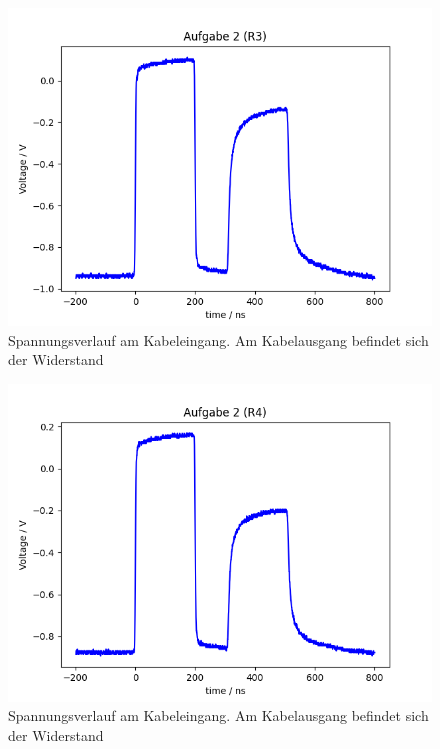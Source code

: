 \documentclass{article}
\begin{document}
\begin{figure}[H]
\centering
\caption{Spannungsverlauf am Kabeleingang. Am Kabelausgang befindet sich der Widerstand }
\label{fig:task2_R3}
\includegraphics[scale=0.6]{bilder/task2/task2_R3.png}
\end{figure}


\begin{figure}[H]
\centering
\caption{Spannungsverlauf am Kabeleingang. Am Kabelausgang befindet sich der Widerstand }
\label{fig:task2_R4}
\includegraphics[scale=0.6]{bilder/task2/task2_R4.png}
\end{figure}
\end{document}
